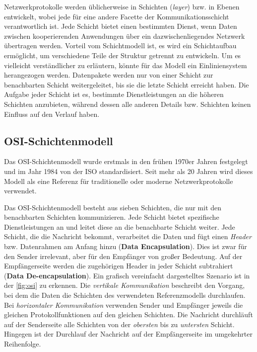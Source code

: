 Netzwerkprotokolle werden üblicherweise in Schichten (\textit{layer}) bzw. in Ebenen entwickelt, wobei jede für eine andere Facette der Kommunikationsschicht verantwortlich ist. Jede Schicht bietet einen bestimmten Dienst, wenn Daten zwischen kooperierenden Anwendungen über ein dazwischenliegendes Netzwerk übertragen werden. Vorteil vom Schichtmodell ist, es wird ein Schichtaufbau ermöglicht, um verschiedene Teile der Struktur getrennt zu entwickeln. Um es vielleicht verständlicher zu erläutern, könnte für das Modell ein Einliniensystem herangezogen werden. Datenpakete werden nur von einer Schicht zur benachbarten Schicht weitergeleitet, bis sie die letzte Schicht erreicht haben. Die Aufgabe jeder Schicht ist es, bestimmte Dienstleistungen an die höheren Schichten anzubieten, während dessen alle anderen Details bzw. Schichten keinen Einfluss auf den Verlauf haben. 

\subsection{OSI-Schichtenmodell}\label{sub:osi}

Das OSI-Schichtenmodell wurde erstmals in den frühen 1970er Jahren festgelegt und im Jahr 1984 von der ISO standardisiert. Seit mehr als 20 Jahren wird dieses Modell als eine Referenz für traditionelle oder moderne Netzwerkprotokolle verwendet. \smallskip \smallskip 

Das OSI-Schichtenmodell besteht aus sieben Schichten, die nur mit den benachbarten Schichten kommunizieren. Jede Schicht bietet spezifische Dienstleistungen an und leitet diese an die benachbarte Schicht weiter. Jede Schicht, die die Nachricht bekommt, verarbeitet die Daten und fügt einen \textit{Header} bzw. Datenrahmen am Anfang hinzu (\textbf{Data Encapsulation}). Dies ist zwar für den Sender irrelevant, aber für den Empfänger von großer Bedeutung. Auf der Empfängerseite werden die zugehörigen Header in jeder Schicht subtrahiert (\textbf{Data De-encapsulation}). Ein grafisch vereinfacht dargestelltes Szenario ist in der \autoref{fig:osi} zu erkennen. Die \textit{vertikale Kommunikation} beschreibt den Vorgang, bei dem die Daten die Schichten des verwendeten Referenzmodells durchlaufen. Bei \textit{horizontaler Kommunikation} verwenden Sender und Empfänger jeweils die gleichen Protokollfunktionen auf den gleichen Schichten. Die Nachricht durchläuft auf der Senderseite alle Schichten von der \textit{obersten} bis zu \textit{untersten} Schicht. Hingegen ist der Durchlauf der Nachricht auf der Empfängerseite im umgekehrter Reihenfolge. \smallskip \smallskip

